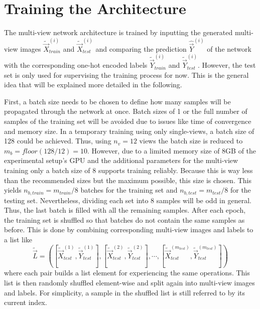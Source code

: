\section{Training the Architecture}
\label{sec:methods-training}
The multi-view network architecture is trained by inputting the generated multi-view images $\tilde{\vec{X}}_{train}^{(i)}$ and $\tilde{\vec{X}}_{test}^{(i)}$ and comparing the prediction $\hat{\vec{Y}}^{(i)}$ of the network with the corresponding one-hot encoded labels $\tilde{\vec{Y}}_{train}^{(i)}$ and $\tilde{\vec{Y}}_{test}^{(i)}$.
However, the test set is only used for supervising the training process for now.
This is the general idea that will be explained more detailed in the following.

First, a batch size needs to be chosen to define how many samples will be propagated through the network at once.
Batch sizes of 1 or the full number of samples of the training set will be avoided due to issues like time of convergence and memory size.
In a temporary training using only single-views, a batch size of 128 could be achieved.
Thus, using $n_v = 12$ views the batch size is reduced to $m_b = floor(128 / 12) = 10$.
However, due to a limited memory size of 8GB of the experimental setup's GPU and the additional parameters for the multi-view training only a batch size of 8 supports training reliably.
Because this is way less than the recommended sizes but the maximum possible, this size is chosen.
This yields $n_{b,train} = m_{train} / 8$ batches for the training set and $n_{b,test} = m_{test} / 8$ for the testing set.
Nevertheless, dividing each set into 8 samples will be odd in general.
Thus, the last batch is filled with all the remaining samples.
After each epoch, the training set is shuffled so that batches do not contain the same samples as before.
This is done by combining corresponding multi-view images and labels to a list like
\begin{equation}
\tilde{\vec{L}} = \left( \left[ \tilde{\vec{X}}_{test}^{(1)}, \tilde{\vec{Y}}_{test}^{(1)} \right], \left[ \tilde{\vec{X}}_{test}^{(2)}, \tilde{\vec{Y}}_{test}^{(2)} \right], \cdots , \left[ \tilde{\vec{X}}_{test}^{(m_{test})}, \tilde{\vec{Y}}_{test}^{(m_{test})} \right] \right)
\end{equation}
where each pair builds a list element for experiencing the same operations.
This list is then randomly shuffled element-wise and split again into multi-view images and labels.
For simplicity, a sample in the shuffled list is still referred to by its current index.

